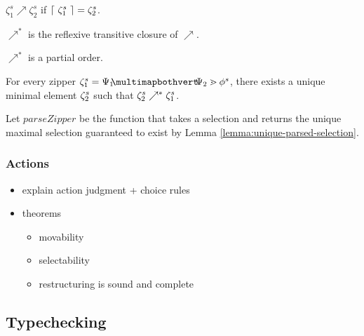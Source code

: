 \begin{definition}
  $\zeta^s_1\nearrow\zeta^s_2$ if $\left\lceil~\zeta^s_1~\right\rceil = \zeta^s_2$.
\end{definition}

\begin{definition}
  $\nearrow^*$ is the reflexive transitive closure of $\nearrow$.
\end{definition}

\begin{lemma}
  $\nearrow^*$ is a partial order.
\end{lemma}

\begin{lemma}
  For every zipper $\zip^s_1 = \zipper{\pointing{\selection_1}{\selection_2}}{\tfrelem^s}$, there exists
  a unique minimal element $\zeta^s_2$ such that $\zeta^s_2 \nearrow^* \zeta^s_1$.
\end{lemma}

\begin{definition}
  Let $parseZipper$ be the function that takes a selection
  and returns the unique maximal selection guaranteed to exist
  by Lemma \ref{lemma:unique-parsed-selection}.
\end{definition}





\subsubsection{Actions}


\begin{itemize}
  \item explain action judgment + choice rules
  \item theorems
  \begin{itemize}
    \item movability
    \item selectability
    \item restructuring is sound and complete
  \end{itemize}
\end{itemize}

\subsection{Typechecking}
